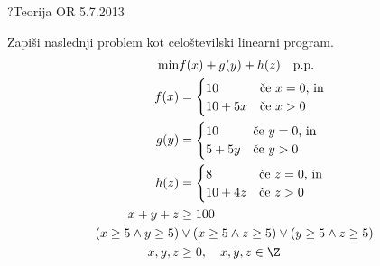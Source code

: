 \begin{naloga}{?}{Teorija OR 5.7.2013}
\begin{vprasanje}
Zapiši naslednji problem kot celoštevilski linearni program.
\begin{align*}
\min & f(x) + g(y) + h(z) \quad \text{p.p.} \\
f(x) &= \begin{cases}
        10      & \text{če $x = 0$, in} \\
        10 + 5x & \text{če $x > 0$}
        \end{cases} \\
g(y) &= \begin{cases}
        10     & \text{če $y = 0$, in} \\
        5 + 5y & \text{če $y > 0$}
        \end{cases} \\
h(z) &= \begin{cases}
        8       & \text{če $z = 0$, in} \\
        10 + 4z & \text{če $z > 0$}
        \end{cases} \\
x + y + z &\ge 100 \\
      (x \ge 5 \land y \ge 5)
&\lor (x \ge 5 \land z \ge 5)
 \lor (y \ge 5 \land z \ge 5) \\
x, y, z &\ge 0, \quad x, y, z \in \Z
\end{align*}
\end{vprasanje}
\begin{odgovor}
\end{odgovor}
\end{naloga}
